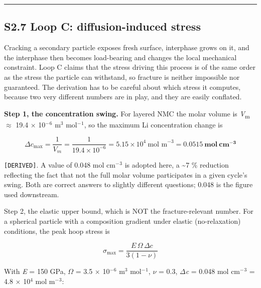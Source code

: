 \documentclass[11pt,a4paper]{article}
\begin{document}
\par\noindent\rule{\linewidth}{0.4pt}\par


\subsection*{S2.7 Loop C: diffusion-induced stress}


Cracking a secondary particle exposes fresh surface, interphase grows on it, and the interphase then becomes load-bearing and changes the local mechanical constraint. Loop C claims that the stress driving this process is of the same order as the stress the particle can withstand, so fracture is neither impossible nor guaranteed. The derivation has to be careful about which stress it computes, because two very different numbers are in play, and they are easily conflated.


\textbf{Step 1, the concentration swing.} For layered NMC the molar volume is \emph{V}\textsubscript{m} \ensuremath{\approx} 19.4 \ensuremath{\times} 10\ensuremath{^{-}}\ensuremath{^{6}} m\ensuremath{^{3}} mol\ensuremath{^{-}}\ensuremath{^{1}}, so the maximum Li concentration change is


\begin{equation}\Delta c_{\max} = \frac{1}{V_m} = \frac{1}{19.4\times10^{-6}} = 5.15\times10^{4}\ \text{mol m}^{-3} = \mathbf{0.0515\ mol\ cm^{-3}} \tag{S2.21}\end{equation}


\texttt{[DERIVED]}. A value of 0.048 mol cm\ensuremath{^{-}}\ensuremath{^{3}} is adopted here, a \textasciitilde{}7 \% reduction reflecting the fact that not the full molar volume participates in a given cycle's swing. Both are correct answers to slightly different questions; 0.048 is the figure used downstream.


Step 2, the elastic upper bound, which is NOT the fracture-relevant number. For a spherical particle with a composition gradient under elastic (no-relaxation) conditions, the peak hoop stress is


\begin{equation}\sigma_{\max} = \frac{E\,\Omega\,\Delta c}{3(1-\nu)} \tag{S2.22}\end{equation}


With \emph{E} = 150 GPa, \ensuremath{\Omega} = 3.5 \ensuremath{\times} 10\ensuremath{^{-}}\ensuremath{^{6}} m\ensuremath{^{3}} mol\ensuremath{^{-}}\ensuremath{^{1}}, \ensuremath{\nu} = 0.3, \ensuremath{\Delta}\emph{c} = 0.048 mol cm\ensuremath{^{-}}\ensuremath{^{3}} = 4.8 \ensuremath{\times} 10\ensuremath{^{4}} mol m\ensuremath{^{-}}\ensuremath{^{3}}:
\end{document}
